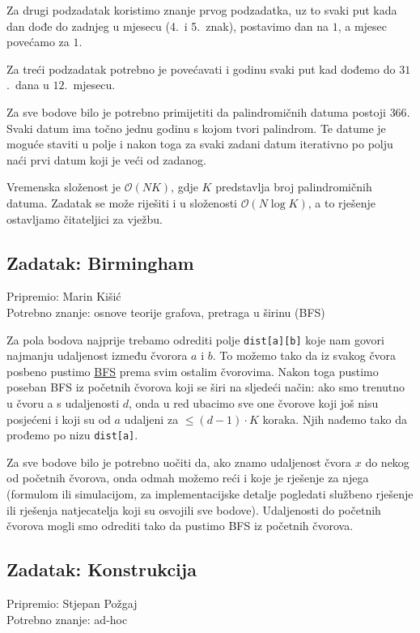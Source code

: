 \documentclass[a4paper]{article}
\begin{document}
Za drugi podzadatak koristimo znanje
prvog podzadatka, uz to svaki put kada dan dođe do zadnjeg u mjesecu (4.\ i 5.\
znak), postavimo dan na $1$, a mjesec povećamo za $1$.

Za treći podzadatak potrebno
je povećavati i godinu svaki put kad dođemo do $31$.\ dana u $12$.\ mjesecu.

Za sve
bodove bilo je potrebno primijetiti da palindromičnih datuma postoji $366$. Svaki
datum ima točno jednu godinu s kojom tvori palindrom. Te datume je moguće
staviti u polje i nakon toga za svaki zadani datum iterativno po polju naći
prvi datum koji je veći od zadanog.

Vremenska složenost je $\mathcal{O}(NK)$, gdje $K$ predstavlja broj
palindromičnih datuma. Zadatak se može riješiti i u složenosti $\mathcal{O}(N
\log K)$, a to rješenje ostavljamo čitateljici za vježbu.

\clearpage

\subsection*{Zadatak: Birmingham}
\textsf{Pripremio: Marin Kišić}\\
\textsf{Potrebno znanje: osnove teorije grafova, pretraga u širinu (BFS)}

Za pola bodova najprije trebamo odrediti polje \texttt{dist[a][b]} koje nam
govori najmanju udaljenost između čvorora $a$ i $b$. To možemo tako da iz
svakog čvora posbeno pustimo
\href{https://en.wikipedia.org/wiki/Breadth-first\_search}{BFS} prema svim
ostalim čvorovima. Nakon toga pustimo poseban BFS iz početnih čvorova koji se
širi na sljedeći način: ako smo trenutno u čvoru a s udaljenosti $d$, onda u
red ubacimo sve one čvorove koji još nisu posjećeni i koji su od $a$ udaljeni
za $\le (d-1) \cdot K$ koraka.  Njih nađemo tako da prođemo po nizu
\texttt{dist[a]}.

Za sve bodove bilo je potrebno uočiti da, ako znamo udaljenost čvora $x$ do
nekog od početnih čvorova, onda odmah možemo reći i koje je rješenje za njega
(formulom ili simulacijom, za implementacijske detalje pogledati službeno
rješenje ili rješenja natjecatelja koji su osvojili sve bodove). Udaljenosti do
početnih čvorova mogli smo odrediti tako da pustimo BFS iz početnih čvorova.

\subsection*{Zadatak: Konstrukcija}
\textsf{Pripremio: Stjepan Požgaj}\\
\textsf{Potrebno znanje: ad-hoc}
\end{document}
